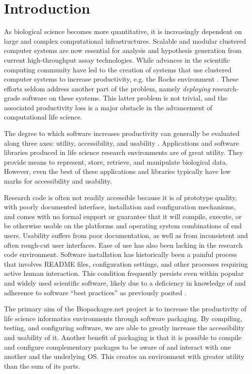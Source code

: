 
\section{Introduction}

As biological science becomes more quantitative, it is increasingly dependent
on large and complex computational infrastructures.  Scalable and modular clustered
computer systems are now essential for analysis and hypothesis generation from
current high-throughput assay technologies.  While advances in the scientific computing
community have led to the creation of systems that use clustered computer systems to
increase productivity, e.g. the Rocks environment \cite{rocks}. These efforts seldom address another part of the
problem, namely \textit{deploying} research-grade software on these systems.  This latter problem is not trivial, and the associated
productivity loss is a major obstacle in the advancement of computational life science.

The degree to which software increases productivity can generally be evaluated
along three axes: utility, accessibility, and usability \cite{keates}.  Applications and software libraries produced in life science research environments
are of great utility.  They provide means to represent, store, retrieve, and manipulate
biological data.  However, even the best of these applications and libraries typically have low marks
for accessibility and usability.

Research code is often not readily accessible because it is of prototype
quality, with poorly documented interface, installation and configuration
mechanisms, and comes with no formal support or guarantee that it will compile,
execute, or be otherwise usable on the platforms and operating system combinations of end users.  Usability suffers from poor documentation, as well
as from inconsistent and often rough-cut user interfaces.  Ease of use has also been
lacking in the research code environment. Software installation has historically
been a painful process that involves README files, configuration settings, and
other processes requiring active human interaction.  This condition frequently
persists even within popular and widely used scientific software, likely due to a
deficiency in knowledge of and adherence to software ``best practices'' as
previously posited \cite{baxter}.

The primary aim of the Biopackages.net project is to increase the productivity
of life science informatics environments through software packaging.  By
compiling, testing, and configuring software, we are able to greatly increase the
accessibility and usability of it.  Another benefit of packaging is that it is possible to
compile and configure complementary packages to be aware of and interact with
one another and the underlying OS.  This creates an environment
with greater utility than the sum of its parts.

